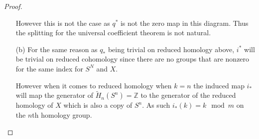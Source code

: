 \documentclass[10pt]{article}
\newcommand{\bb}[1]{\mathbb{#1}}
\newcommand{\rH}{\widetilde{H}}
\theoremstyle{remark}
\begin{document}
\begin{proof}
\begin{itemize}
    However this is not the case as $q^*$ is not the zero map in this diagram.
    Thus the splitting for the universal coefficient theorem is not natural.
\item[(b)] For the same reason as $q_*$ being trivial on reduced homology above, $i^*$
  will be trivial on reduced cohomology since there are no groups that are nonzero
  for the same index for $S^N$ and $X$.

  However when it comes to reduced homology when $k=n$ the induced map $i_*$
  will map the generator of $\rH_n(S^n)=\bb{Z}$ to the generator of the reduced
  homology of $X$ which is also a copy of $S^n$. As such $i_*(k)=k\mod m$
  on the $n$th homology group.
  \end{itemize}
\end{proof}
\end{document}
